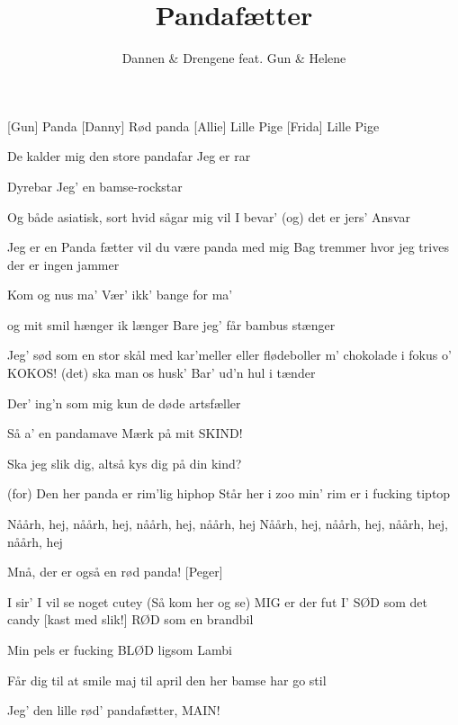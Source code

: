 \documentclass[a4paper,11pt]{article}
\title{Pandafætter}
\author{Dannen \& Drengene feat. Gun \& Helene}
\begin{document}
\maketitle

\begin{roles}
    [Gun] Panda
    [Danny] Rød panda
    [Allie] Lille Pige
    [Frida] Lille Pige
\end{roles}



\begin{song}

De kalder mig den store pandafar
Jeg er rar

Dyrebar
Jeg' en bamse-rockstar

Og både asiatisk, sort
hvid sågar
mig vil I bevar'
(og) det er jers' Ansvar

Jeg er en Panda fætter
vil du være panda med mig
Bag tremmer
hvor jeg trives
der er ingen jammer

Kom og nus ma'
Vær' ikk' bange for ma'

og mit smil hænger
ik længer
Bare jeg' får bambus stænger

Jeg’ sød som en stor skål med kar’meller
eller flødeboller
m’ chokolade i fokus
o’ KOKOS!
(det) ska man os husk’
Bar’ ud’n hul i tænder

Der’ ing’n som mig
kun de døde artsfæller

Så a' en pandamave
Mærk på mit SKIND!

Ska jeg slik dig, altså kys dig på din kind?

(for) Den her panda er rim’lig hiphop
Står her i zoo
min’ rim er i fucking tiptop

Nåårh, hej, nåårh, hej, nåårh, hej, nåårh, hej
Nåårh, hej, nåårh, hej, nåårh, hej, nåårh, hej

Mnå, der er også en rød panda! [Peger]

I sir’ I vil se noget cutey
(Så kom her og se) MIG er der fut I’
SØD som det candy [kast med slik!]
RØD som en brandbil

Min pels er fucking BLØD ligsom Lambi

Får dig til at smile
maj til april
den her bamse har go stil

Jeg’ den lille rød’ pandafætter, MAIN!


\end{song}
\end{document}
